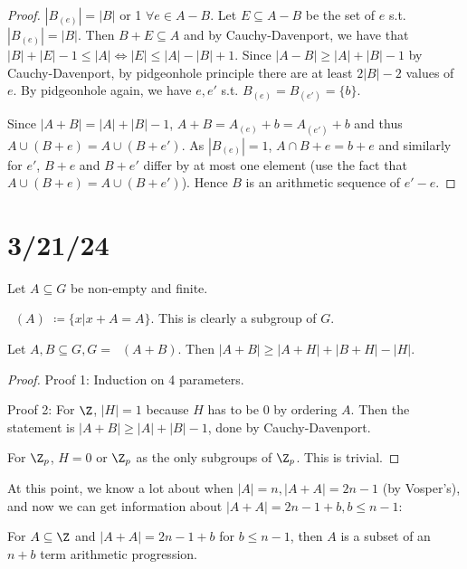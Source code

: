 \documentclass[a4paper]{article}
\DeclareMathOperator{\Sym}{Sym_1}
\begin{document}
\begin{proof}
	$|B_{(e)}| = |B|$ or 1 $\forall e \in A-B$.
	Let $E \subseteq A - B$ be the set of $e $ s.t. $|B_{(e)}| = |B| $.
	Then $B + E \subseteq A $ and by Cauchy-Davenport, we have that $|B| + |E| - 1 \le |A| \iff |E| \le |A| - |B| + 1 $.
	Since $|A - B| \ge |A| + |B| - 1 $ by Cauchy-Davenport, by pidgeonhole principle there are at least $2|B| - 2$ values of $e $.
	By pidgeonhole again, we have $e,e' $ s.t. $B_{(e)} = B_{(e')} = \{b\} $.

	Since $|A+B| = |A| + |B| - 1 $, $A+B = A_{(e)} + b = A_{(e')} + b $ and thus $A\cup (B+e) = A \cup (B+e') $.
	As $|B_{(e)}| = 1 $, $A \cap B+e = b + e$ and similarly for $e' $, $B+e $ and $B+e' $ differ by at most one element (use the fact that $A\cup (B+e) = A \cup (B+e')$).
	Hence $B $ is an arithmetic sequence of $e' - e $.
\end{proof}

\section{3/21/24}

Let $A \subseteq G $ be non-empty and finite.

\begin{definition}
	\textbf{$\Sym(A) $} $\coloneqq \{x | x+A = A\}   $.
	This is clearly a subgroup of $G $.
\end{definition}

\begin{thm}[Kneser (53)]
	Let $A,B \subseteq G, G = \Sym(A+B) $.
	Then $|A+B| \ge |A+H| + |B+H| - |H| $.
\end{thm}

\begin{proof}
	Proof 1: Induction on 4 parameters.

	Proof 2:
	For $\Z $, $|H| = 1 $ because $H $ has to be 0 by ordering $A $.
	Then the statement is $|A+B| \ge |A| + |B| - 1 $, done by Cauchy-Davenport.

	For $\Z_p $, $H= 0 $ or $\Z_p $ as the only subgroups of $\Z_p $.
	This is trivial.
\end{proof}

At this point, we know a lot about when $|A| = n, |A+A| = 2n-1$ (by Vosper's), and now we can get information about $|A+A| = 2n-1 + b, b \le n-1$:

\begin{thm}[Freiman's $3k-3 $]
	For $A\subseteq \Z $ and $|A+A| = 2n-1 + b $ for $b \le n-1 $, then $A $ is a subset of an $n+b $ term arithmetic progression.
\end{thm}
\end{document}

